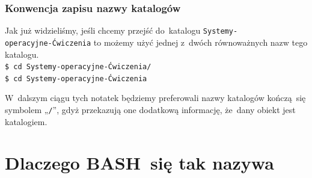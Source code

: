 \documentclass[10pt,t]{beamer}
\begin{document}
\begin{frame}
  \frametitle{Konwencja zapisu nazwy katalogów}


  Jak już widzieliśmy, jeśli chcemy przejść do~katalogu \texttt{Systemy-} \\
  \texttt{operacyjne-Ćwiczenia} to możemy użyć jednej z~dwóch
  równoważnych nazw tego katalogu. \\
  \texttt{\$ cd Systemy-operacyjne-Ćwiczenia/} \\
  \texttt{\$ cd Systemy-operacyjne-Ćwiczenia}

  W~dalszym ciągu tych notatek będziemy preferowali nazwy katalogów
  kończą~się symbolem „\texttt{/}”, gdyż przekazują one dodatkową
  informację, że~dany obiekt jest katalogiem.

\end{frame}










\appendix















\section{Dlaczego BASH~się tak nazywa}
\end{document}
